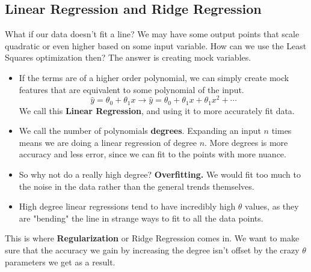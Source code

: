\documentclass{article}
\begin{document}
\subsection{Linear Regression and Ridge Regression}
What if our data doesn't fit a line?  We may have some output points that scale quadratic or even higher based on some input variable. How can we use the Least Squares optimization then? The answer is creating mock variables. 
\begin{itemize}
    \item If the terms are of a higher order polynomial, we can simply create mock features that are equivalent to some polynomial of the input.
    $$\hat{y} = \theta_0 + \theta_1x \longrightarrow \hat{y} = \theta_0 + \theta_1x + \theta_1x^2 + \cdots$$
    We call this \textbf{Linear Regression}, and using it to more accurately fit data.
    
    \item We call the number of polynomials \textbf{degrees}. Expanding an input $n$ times means we are doing a linear regression of degree $n$. More degrees is more accuracy and less error, since we can fit to the points with more nuance.
    
    \item So why not do a really high degree? \textbf{Overfitting.} We would fit too much to the noise in the data rather than the general trends themselves. 
    \item High degree linear regressions tend to have incredibly high $\theta$ values, as they are "bending" the line in strange ways to fit to all the data points.
\end{itemize}
This is where \textbf{Regularization} or Ridge Regression comes in. We want to make sure that the accuracy we gain by increasing the degree isn't offset by the crazy $\theta$ parameters we get as a result. 
\end{document}
